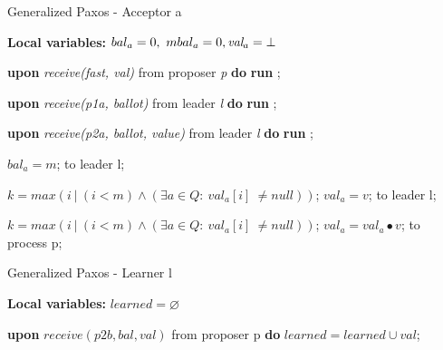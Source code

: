\begin{algorithm}
\caption{Generalized Paxos - Acceptor a}
\textbf{Local variables: } $bal_a = 0,\ mbal_a = 0, \textit{val}_a = \bot$ 
\begin{algorithmic}[1]
  
  \State \textbf{upon} \textit{receive(fast, val)} from proposer \textit{p} \textbf{do}
    \State \hspace{\algorithmicindent} \textbf{run} ;
    
    \State
    \State \textbf{upon} \textit{receive(p1a, ballot)} from leader \textit{l} \textbf{do}
    \State \hspace{\algorithmicindent} \textbf{run} ;
    
    \State
    \State \textbf{upon} \textit{receive(p2a, ballot, value)} from leader \textit{l} \textbf{do}
    \State \hspace{\algorithmicindent} \textbf{run} ;
    
    \State
            \State $bal_a = m$;
            \State {} to leader l;
        \EndIf
    \EndFunction
    
    \State
        \State $k = max(i\ |\ (i < m) \wedge (\exists a \in Q :\ val_a[i]\ \neq null))$;
            \State $val_a = v$;
            \State {} to leader l;
        \EndIf
    \EndFunction
    
    \State
        \State $k = max(i\ |\ (i < m) \wedge (\exists a \in Q :\ val_a[i]\ \neq null))$;
            \State $val_a = val_a \bullet v$;
            \State {} to process p;
        \EndIf
    \EndFunction
    
\end{algorithmic}
\end{algorithm}

\begin{algorithm}
\caption{Generalized Paxos - Learner l}
\textbf{Local variables: } $learned = \varnothing$ 
\begin{algorithmic}[1]
  
    \State \textbf{upon} $receive (p2b, bal, val)$ from proposer p \textbf{do}
        \State \hspace{\algorithmicindent} $learned = learned \cup val$;
\end{algorithmic}
\end{algorithm}